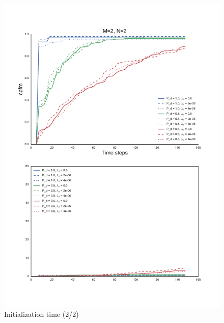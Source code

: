 {\begin{figure}
\centering
\includegraphics[height = .9\textheight]{Figures/plots/Scenario1_Init-Time(2-2).pdf}
\caption{Initialization time (2/2)}\label{fig:init_time_2-2}
\end{figure}

}
